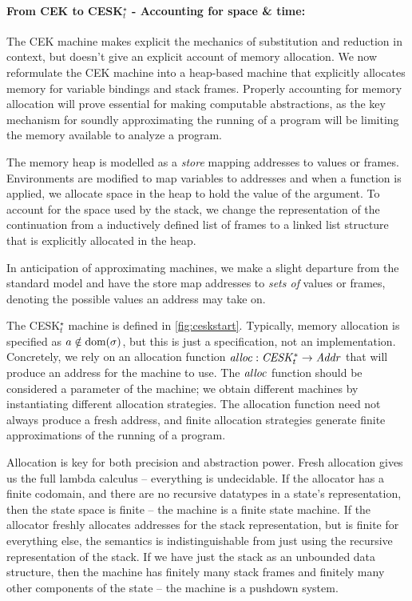 \paragraph{From CEK to CESK$_t^\star$ - Accounting for space \& time:}

The CEK machine makes explicit the mechanics of substitution and
reduction in context, but doesn't give an explicit account of memory
allocation.  We now reformulate the CEK machine into a heap-based
machine that explicitly allocates memory for variable bindings and
stack frames.  Properly accounting for memory allocation will prove
essential for making computable abstractions, as the key mechanism for
soundly approximating the running of a program will be limiting the
memory available to analyze a program.

The memory heap is modelled as a \emph{store} mapping addresses to
values or frames.  Environments are modified to map variables to
addresses and when a function is applied, we allocate space in the
heap to hold the value of the argument.
%
To account for the space used by the stack, we change the
representation of the continuation from a inductively defined list of
frames to a linked list structure that is explicitly allocated in the
heap.

In anticipation of approximating machines, we make a slight
departure from the standard model and have the store map addresses to
\emph{sets of} values or frames, denoting the possible values an address may take on.


The CESK$_t^\star$ machine is defined in \autoref{fig:ceskstart}.
%
%
Typically, memory allocation is specified as $a \notin \text{dom}(\sigma)$, but this is just a specification, not an implementation.
%
Concretely, we rely on an allocation function $\mathit{alloc} : \mathit{CESK^*_t} \to \mathit{Addr}$ that will produce an address for the machine to use.
%
The $\mathit{alloc}$ function should be considered a parameter of the machine; we 
obtain different machines by instantiating different allocation strategies.
%
The allocation function need not always produce a fresh address, and finite
allocation strategies generate finite approximations of the running of a program.


%
Allocation is key for both precision and abstraction power.
%
Fresh allocation gives us the full lambda calculus -- everything is undecidable.
%
If the allocator has a finite codomain, and there are no recursive datatypes in a state's representation, then the state space is finite -- the machine is a finite state machine.
%
If the allocator freshly allocates addresses for the stack representation, but is finite for everything else, the semantics is indistinguishable from just using the recursive representation of the stack.
%
If we have just the stack as an unbounded data structure, then the machine has finitely many stack frames and finitely many other components of the state -- the machine is a pushdown system.
%

